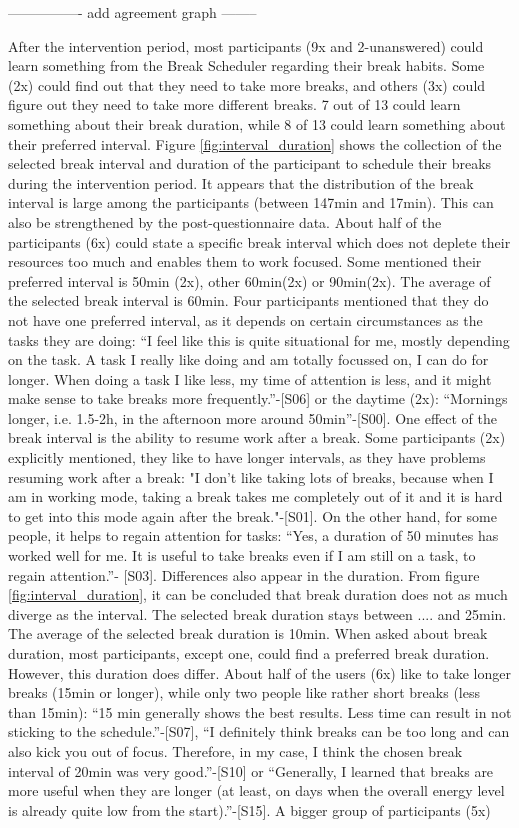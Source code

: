 \documentclass{hasel_thesis}
\begin{document}
---------------- add agreement graph --------


After the intervention period, most participants (9x and 2-unanswered) could learn something from the Break Scheduler regarding their break habits. Some (2x) could find out that they need to take more breaks, and others (3x) could figure out they need to take more different breaks. 7 out of 13 could learn something about their break duration, while 8 of 13 could learn something about their preferred interval. Figure \ref{fig:interval_duration} shows the collection of the selected break interval and duration of the participant to schedule their breaks during the intervention period. It appears that the distribution of the break interval is large among the participants (between 147min and 17min). This can also be strengthened by the post-questionnaire data. About half of the participants (6x) could state a specific break interval which does not deplete their resources too much and enables them to work focused. Some mentioned their preferred interval is 50min (2x), other 60min(2x) or 90min(2x). The average of the selected break interval is 60min. Four participants mentioned that they do not have one preferred interval, as it depends on certain circumstances as the tasks they are doing: “I feel like this is quite situational for me, mostly depending on the task. A task I really like doing and am totally focussed on, I can do for longer. When doing a task  I like less, my time of attention is less, and it might make sense to take breaks more frequently.”-[S06] or the daytime (2x): “Mornings longer, i.e. 1.5-2h, in the afternoon more around 50min”-[S00]. One effect of the break interval is the ability to resume work after a break. Some participants (2x) explicitly mentioned, they like to have longer intervals, as they have problems resuming work after a break: "I don't like taking lots of breaks, because when I am in working mode, taking a break takes me completely out of it and it is hard to get into this mode again after the break."-[S01]. On the other hand, for some people, it helps to regain attention for tasks: “Yes, a duration of 50 minutes has worked well for me. It is useful to take breaks even if I am still on a task, to regain attention.”- [S03]. Differences also appear in the duration. From figure \ref{fig:interval_duration}, it can be concluded that break duration does not as much diverge as the interval. The selected break duration stays between .... and 25min. The average of the selected break duration is 10min. When asked about break duration, most participants, except one, could find a preferred break duration. However, this duration does differ. About half of the users (6x) like to take longer breaks (15min or longer), while only two people like rather short breaks (less than 15min): “15 min generally shows the best results. Less time can result in not sticking to the schedule.”-[S07], “I definitely think breaks can be too long and can also kick you out of focus. Therefore, in my case, I think the chosen break interval of 20min was very good.”-[S10] or “Generally, I learned that breaks are more useful when they are longer (at least, on days when the overall energy level is already quite low from the start).”-[S15]. A bigger group of participants (5x) 
\end{document}
